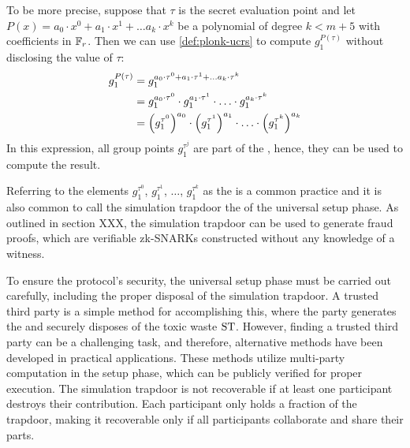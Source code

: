 To be more precise, suppose that $\tau$ is the secret evaluation point and let $P(x)=a_0\cdot x^0 + a_1\cdot x^1 + \ldots a_k\cdot x^k$ be a polynomial of degree $k<m+5$ with coefficients in $\mathbb{F}_r$. Then we can use \ref{def:plonk-ucrs} to compute $g_1^{P(\tau)}$ without disclosing the value of $\tau$:
\begin{align}
\label{eq:exp_evaluation-poly-plonk}
g_1^{P(\tau)} & = g_1^{a_0\cdot \tau^0 + a_1\cdot \tau^1 + \ldots a_k\cdot \tau^k} \notag\\
 & = g_1^{a_0\cdot \tau^0} \cdot g_1^{a_1\cdot \tau^1} \cdot \ldots \cdot g_1^{a_k\cdot \tau^k}\notag\\
 & = \Big(g_1^{\tau^0}\Big)^{a_0} \cdot \Big(g_1^{\tau^1}\Big)^{a_1} \cdot \ldots \cdot \Big(g_1^{\tau^k}\Big)^{a_k}
\end{align}
In this expression, all group points $g_1^{\tau^j}$ are part of the , hence, they can be used to compute the result.

Referring to the elements $g_{1}^{\tau^0}$, $g_{1}^{\tau^1}$, $\ldots$, $g_{1}^{\tau^k}$ as the  is a common practice and it is also common to call the simulation trapdoor the  of the universal setup phase. As outlined in section XXX, the simulation trapdoor can be used to generate fraud proofs, which are verifiable zk-SNARKs constructed without any knowledge of a witness.

To ensure the protocol's security, the universal setup phase must be carried out carefully, including the proper disposal of the simulation trapdoor. A trusted third party is a simple method for accomplishing this, where the party generates the  and securely disposes of the toxic waste $\mathrm{ST}$. However, finding a trusted third party can be a challenging task, and therefore, alternative methods have been developed in practical applications. These methods utilize multi-party computation in the setup phase, which can be publicly verified for proper execution. The simulation trapdoor is not recoverable if at least one participant destroys their contribution. Each participant only holds a fraction of the trapdoor, making it recoverable only if all participants collaborate and share their parts.

